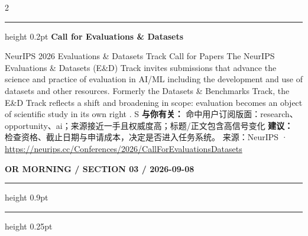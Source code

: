 \documentclass[10.5pt]{ctexart}
\begin{document}
\begin{multicols}{2}
\vspace{2mm}
\hrule height 0.2pt
\vspace{2mm}
{\large\bfseries Call for Evaluations \& Datasets}\par
NeurIPS 2026 Evaluations \& Datasets Track Call for Papers The NeurIPS Evaluations \& Datasets (E\&D) Track invites submissions that advance the science and practice of evaluation in AI/ML including the development and use of datasets and other resources. Formerly the Datasets \& Benchmarks Track, the E\&D Track reflects a shift and broadening in scope: evaluation becomes an object of scientific study in its own right . S
\textbf{与你有关：} 命中用户订阅版面：research、opportunity、ai；来源接近一手且权威度高；标题/正文包含高信号变化
\textbf{建议：} 检查资格、截止日期与申请成本，决定是否进入任务系统。
{\footnotesize\color{ormuted} 来源：NeurIPS · \url{https://neurips.cc/Conferences/2026/CallForEvaluationsDatasets}}
\end{multicols}
\newpage
{\small\bfseries OR MORNING / SECTION 03 / 2026-09-08}
\vspace{2mm}
\hrule height 0.9pt
\vspace{1.5mm}
\hrule height 0.25pt
\vspace{4mm}
\end{document}
